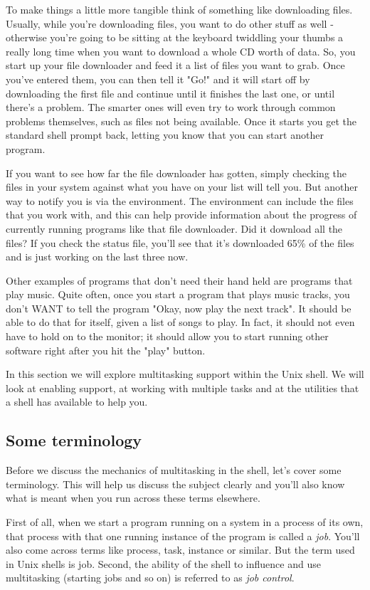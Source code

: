To make things a little more tangible think of something like downloading
files. Usually, while you're downloading files, you want to do other stuff as
well - otherwise you're going to be sitting at the keyboard twiddling your
thumbs a really long time when you want to download a whole CD worth of data.
So, you start up your file downloader and feed it a list of files you want to
grab. Once you've entered them, you can then tell it "Go!" and it will start
off by downloading the first file and continue until it finishes the last one,
or until there's a problem. The smarter ones will even try to work through
common problems themselves, such as files not being available. Once it starts
you get the standard shell prompt back, letting you know that you can start
another program. 

If you want to see how far the file downloader has gotten, simply checking the
files in your system against what you have on your list will tell you. But
another way to notify you is via the environment. The environment can include
the files that you work with, and this can help provide information about the
progress of currently running programs like that file downloader. Did it
download all the files? If you check the status file, you'll see that it's
downloaded 65\% of the files and is just working on the last three now.

Other examples of programs that don't need their hand held are programs that
play music. Quite often, once you start a program that plays music tracks, you
don't WANT to tell the program "Okay, now play the next track". It should be
able to do that for itself, given a list of songs to play. In fact, it should
not even have to hold on to the monitor; it should allow you to start running
other software right after you hit the "play" button.

In this section we will explore multitasking support within the Unix shell. We
will look at enabling support, at working with multiple tasks and at the
utilities that a shell has available to help you.

\subsection{Some terminology} Before we discuss the mechanics of
multitasking in the shell, let's cover some terminology. This will help us
discuss the subject clearly and you'll also know what is meant when you run
across these terms elsewhere.

First of all, when we start a program running on a system in a process of its
own, that process with that one running instance of the program is called a
\textit{job}. You'll also come across terms like process, task, instance or
similar. But the term used in Unix shells is job. Second, the ability of the
shell to influence and use multitasking (starting jobs and so on) is referred
to as \textit{job control}.

